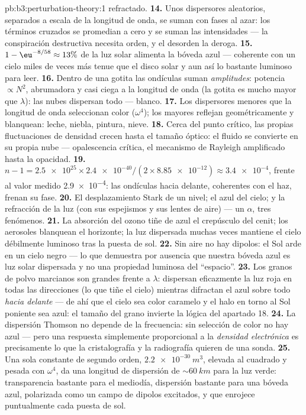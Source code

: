 \begin{solution}{pb:b3:perturbation-theory:1}
refractado.
\textbf{14.} Unos dispersores aleatorios, separados a escala de la longitud
de onda, se suman con fases al azar: los términos cruzados se promedian a
cero y se suman las intensidades --- la conspiración destructiva necesita
orden, y el desorden la deroga.
\textbf{15.} $1 - \eu^{-8/58} \approx 13\%$ de la luz solar alimenta la
bóveda azul --- coherente con un cielo miles de veces más tenue
que el disco solar y aun así lo bastante luminoso para leer.
\textbf{16.} Dentro de una gotita las ondículas suman \emph{amplitudes}:
potencia $\propto N^2$, abrumadora y casi ciega a la longitud de onda
(la gotita es mucho mayor que $\lambda$): las nubes dispersan
todo --- blanco.
\textbf{17.} Los dispersores menores que la longitud de onda seleccionan
color ($\omega^4$); los mayores reflejan geométricamente
y blanquean: leche, niebla, pintura, nieve.
\textbf{18.} Cerca del punto crítico, las propias fluctuaciones de densidad
crecen hasta el tamaño óptico: el fluido se convierte en su propia nube
--- opalescencia crítica, el mecanismo de Rayleigh amplificado hasta la
opacidad.
\textbf{19.} $n - 1 = \num{2.5e25} \times \num{2.4e-40}/(2 \times
\num{8.85e-12}) \approx \num{3.4e-4}$, frente al valor medido
\num{2.9e-4}: las ondículas hacia delante, coherentes con el haz, frenan
su fase.
\textbf{20.} El desplazamiento Stark de un nivel; el azul del cielo; y la
refracción de la luz (con sus espejismos y sus lentes de aire) --- un
$\alpha$, tres fenómenos.
\textbf{21.} La absorción del ozono tiñe de azul el crepúsculo del cenit;
los aerosoles blanquean el horizonte; la luz dispersada muchas veces
mantiene el cielo débilmente luminoso tras la puesta de sol.
\textbf{22.} Sin aire no hay dipolos: el Sol arde en un cielo negro
--- lo que demuestra por ausencia que nuestra bóveda azul es luz solar
dispersada y no una propiedad luminosa del ``espacio''.
\textbf{23.} Los granos de polvo marcianos son grandes frente a $\lambda$:
dispersan eficazmente la luz roja en todas las direcciones (lo que tiñe el
cielo) mientras difractan el azul sobre todo \emph{hacia delante} --- de ahí
que el cielo sea color caramelo y el halo en torno al Sol poniente sea
azul: el tamaño del grano invierte la lógica del apartado 18.
\textbf{24.} La dispersión Thomson no depende de la frecuencia: sin
selección de color no hay azul --- pero una respuesta simplemente
proporcional a la \emph{densidad electrónica} es precisamente lo que la
cristalografía y la radiografía quieren de una sonda.
\textbf{25.} Una sola constante de segundo orden, $\qty{2.2e-30}{m^3}$,
elevada al cuadrado y pesada con $\omega^4$, da una longitud de dispersión
de $\sim\qty{60}{km}$ para la luz verde: transparencia bastante para el
mediodía, dispersión bastante para una bóveda azul, polarizada como un campo
de dipolos excitados, y que enrojece puntualmente cada puesta de sol.
\end{solution}
